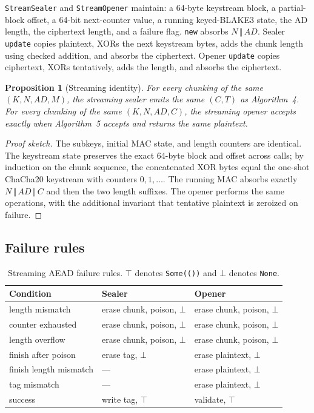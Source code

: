 \documentclass[11pt,a4paper]{article}
\theoremstyle{plain}
\newtheorem{proposition}[theorem]{Proposition}
\theoremstyle{definition}
\theoremstyle{remark}
\newcommand{\concat}{\,\Vert\,}
\begin{document}
\texttt{StreamSealer} and \texttt{StreamOpener} maintain: a 64-byte
keystream block, a partial-block offset, a 64-bit next-counter value, a
running keyed-BLAKE3 state, the AD length, the ciphertext length, and a
failure flag.  \texttt{new} absorbs $N\concat AD$.  Sealer
\texttt{update} copies plaintext, XORs the next keystream bytes, adds
the chunk length using checked addition, and absorbs the ciphertext.
Opener \texttt{update} copies ciphertext, XORs tentatively, adds the
length, and absorbs the ciphertext.

\begin{proposition}[Streaming identity]
For every chunking of the same $(K,N,AD,M)$, the streaming sealer emits
the same $(C,T)$ as Algorithm~4.  For every chunking of the same
$(K,N,AD,C)$, the streaming opener accepts exactly when Algorithm~5
accepts and returns the same plaintext.
\end{proposition}

\begin{proof}[Proof sketch]
The subkeys, initial MAC state, and length counters are identical.  The
keystream state preserves the exact 64-byte block and offset across
calls; by induction on the chunk sequence, the concatenated XOR bytes
equal the one-shot ChaCha20 keystream with counters $0,1,\ldots$.  The
running MAC absorbs exactly $N\concat AD\concat C$ and then the two
length suffixes.  The opener performs the same operations, with the
additional invariant that tentative plaintext is zeroized on failure.
\end{proof}

\subsection{Failure rules}

\begin{table}[t]
\centering
\small
\begin{tabular}{@{}lll@{}}
\toprule
Condition & Sealer & Opener \\
\midrule
length mismatch & erase chunk, poison, $\bot$ & erase chunk, poison, $\bot$ \\
counter exhausted & erase chunk, poison, $\bot$ & erase chunk, poison, $\bot$ \\
length overflow & erase chunk, poison, $\bot$ & erase chunk, poison, $\bot$ \\
finish after poison & erase tag, $\bot$ & erase plaintext, $\bot$ \\
finish length mismatch & --- & erase plaintext, $\bot$ \\
tag mismatch & --- & erase plaintext, $\bot$ \\
success & write tag, $\top$ & validate, $\top$ \\
\bottomrule
\end{tabular}
\caption{Streaming AEAD failure rules.  $\top$ denotes \texttt{Some(())}
and $\bot$ denotes \texttt{None}.}
\label{tab:aeadfail}
\end{table}
\end{document}
